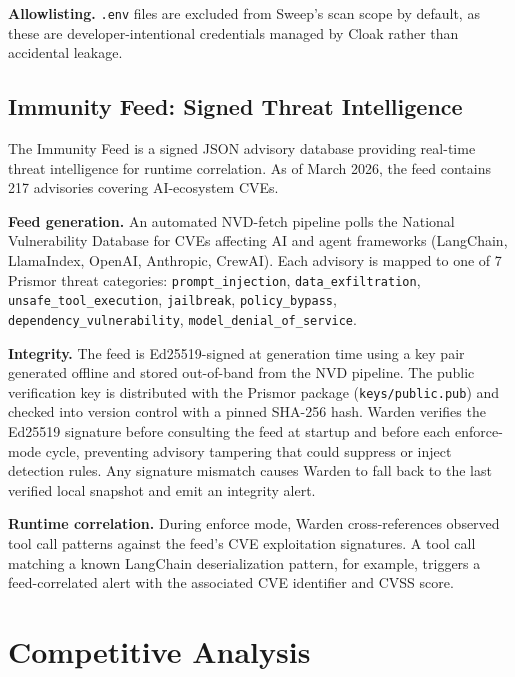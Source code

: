 \documentclass[11pt,letterpaper]{article}
\begin{document}
\textbf{Allowlisting.} \texttt{.env} files are excluded from Sweep's scan scope by
default, as these are developer-intentional credentials managed by Cloak rather than
accidental leakage.

\subsection{Immunity Feed: Signed Threat Intelligence}

The Immunity Feed is a signed JSON advisory database providing real-time threat
intelligence for runtime correlation. As of March 2026, the feed contains 217 advisories
covering AI-ecosystem CVEs.

\textbf{Feed generation.} An automated NVD-fetch pipeline polls the National Vulnerability
Database for CVEs affecting AI and agent frameworks (LangChain, LlamaIndex, OpenAI,
Anthropic, CrewAI). Each advisory is mapped to one of 7 Prismor threat categories:
\texttt{prompt\_injection}, \texttt{data\_exfiltration}, \texttt{unsafe\_tool\_execution},
\texttt{jailbreak}, \texttt{policy\_bypass}, \texttt{dependency\_vulnerability},
\texttt{model\_denial\_of\_service}.

\textbf{Integrity.} The feed is Ed25519-signed at generation time using a key pair
generated offline and stored out-of-band from the NVD pipeline. The public verification
key is distributed with the Prismor package (\texttt{keys/public.pub}) and checked into
version control with a pinned SHA-256 hash. Warden verifies the Ed25519 signature before
consulting the feed at startup and before each enforce-mode cycle, preventing advisory
tampering that could suppress or inject detection rules. Any signature mismatch causes
Warden to fall back to the last verified local snapshot and emit an integrity alert.

\textbf{Runtime correlation.} During enforce mode, Warden cross-references observed
tool call patterns against the feed's CVE exploitation signatures. A tool call matching
a known LangChain deserialization pattern, for example, triggers a feed-correlated alert
with the associated CVE identifier and CVSS score.

\section{Competitive Analysis}
\end{document}
